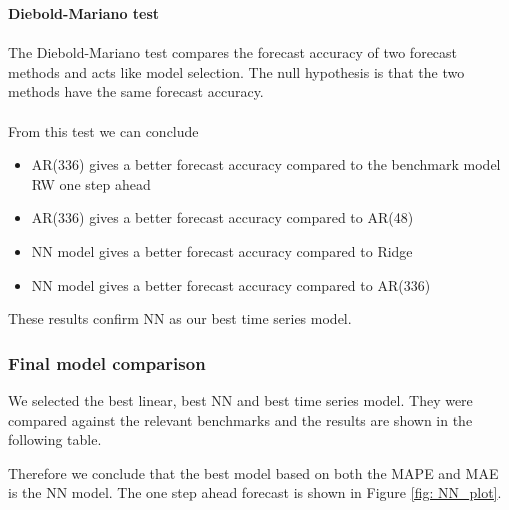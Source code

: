 \documentclass[11pt]{article}
\begin{document}
\noindent \textbf{Diebold-Mariano test}
\\
\\
The Diebold-Mariano test compares the forecast accuracy of two forecast methods and acts like model selection.
The null hypothesis is that the two methods have the same forecast accuracy.
\\
\\
From this test we can conclude 
\begin{itemize}
\item AR(336) gives a better forecast accuracy compared to the benchmark model RW one step ahead
\item AR(336) gives a better forecast accuracy compared to AR(48)
\item NN model gives a better forecast accuracy compared to Ridge
\item NN model gives a better forecast accuracy compared to AR(336)
\end{itemize}

These results confirm NN as our best time series model.

\subsubsection{Final model comparison}
\label{final_models}
We selected the best linear, best NN and best time series model. They were compared against the relevant benchmarks and the results are shown in the following table.

\begin{table}[H]
\centering
\caption{Test performance for selected models}
\label{table:model_evaluation_all}
\end{table}


\noindent Therefore we conclude that the best model based on both the MAPE and MAE is the NN model. The one step ahead forecast is shown in Figure \ref{fig: NN_plot}.
\end{document}
